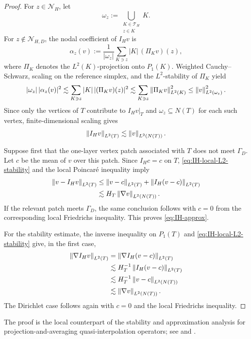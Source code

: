 \begin{proof}
For $z\in\mathcal N_H$, let
\[
  \omega_z
  :=
  \bigcup_{\substack{K\in\mathcal T_H\\ z\in K}}K.
\]
For $z\notin\mathcal N_{H,D}$, the nodal coefficient of $I_Hv$ is
\[
  \alpha_z(v)
  :=
  \frac{1}{|\omega_z|}
  \sum_{K\ni z}|K|\,(\Pi_Kv)(z),
\]
where $\Pi_K$ denotes the $L^2(K)$-projection onto $P_1(K)$.
Weighted Cauchy--Schwarz, scaling on the reference simplex, and the
$L^2$-stability of $\Pi_K$ yield
\[
  |\omega_z|\,|\alpha_z(v)|^2
  \lesssim
  \sum_{K\ni z}|K|\,|(\Pi_Kv)(z)|^2
  \lesssim
  \sum_{K\ni z}\left\lVert \Pi_Kv\right\rVert_{L^2(K)}^2
  \leq
  \left\lVert v\right\rVert_{L^2(\omega_z)}^2.
\]
Since only the vertices of $T$ contribute to $I_Hv|_T$ and
$\omega_z\subseteq N(T)$ for each such vertex, finite-dimensional
scaling gives
\begin{equation}
\label{eq:IH-local-L2-stability}
  \left\lVert I_Hv\right\rVert_{L^2(T)}
  \lesssim
  \left\lVert v\right\rVert_{L^2(N(T))}.
\end{equation}

Suppose first that the one-layer vertex patch associated with $T$ does
not meet $\Gamma_D$. Let $c$ be the mean of $v$ over this patch. Since
$I_Hc=c$ on $T$, \eqref{eq:IH-local-L2-stability} and the local
Poincar\'e inequality imply
\[
\begin{aligned}
  \left\lVert v-I_Hv\right\rVert_{L^2(T)}
  &\leq
  \left\lVert v-c\right\rVert_{L^2(T)}
  +
  \left\lVert I_H(v-c)\right\rVert_{L^2(T)}
\\
  &\lesssim
  H_T
  \left\lVert \nabla v\right\rVert_{L^2(N(T))}.
\end{aligned}
\]
If the relevant patch meets $\Gamma_D$, the same conclusion follows
with $c=0$ from the corresponding local Friedrichs inequality. This
proves \eqref{eq:IH-approx}.

For the stability estimate, the inverse inequality on $P_1(T)$ and
\eqref{eq:IH-local-L2-stability} give, in the first case,
\[
\begin{aligned}
  \left\lVert \nabla I_Hv\right\rVert_{L^2(T)}
  &=
  \left\lVert \nabla I_H(v-c)\right\rVert_{L^2(T)}
\\
  &\lesssim
  H_T^{-1}
  \left\lVert I_H(v-c)\right\rVert_{L^2(T)}
\\
  &\lesssim
  H_T^{-1}
  \left\lVert v-c\right\rVert_{L^2(N(T))}
\\
  &\lesssim
  \left\lVert \nabla v\right\rVert_{L^2(N(T))}.
\end{aligned}
\]
The Dirichlet case follows again with $c=0$ and the local Friedrichs
inequality.
\end{proof}

The proof is the local counterpart of the stability and approximation
analysis for projection-and-averaging quasi-interpolation operators;
see \cite[Appendix]{KornhuberPeterseimYserentant2018} and
\cite{ErnGuermond2017}.


